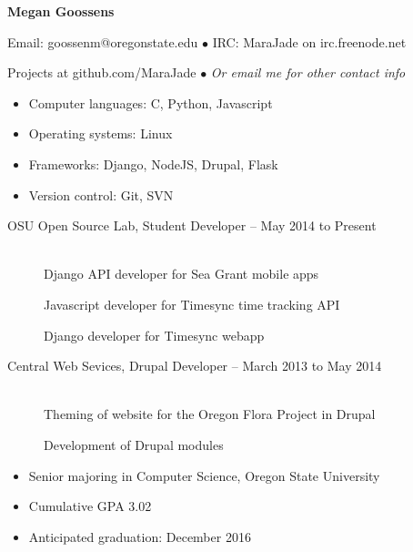 \documentclass[11pt]{article}
\begin{document}
\centerline{{\LARGE \bf Megan Goossens}}

\bigskip

\centerline{Email: goossenm@oregonstate.edu
        $\bullet$
        IRC: MaraJade on irc.freenode.net}
\centerline{Projects at github.com/MaraJade 
        $\bullet$
        \emph{Or email me for other contact info}}

\smallskip
\hrulefill
\bigskip

\begin{itemize}
  \item Computer languages: C, Python, Javascript

  \item Operating systems: Linux

  \item Frameworks: Django, NodeJS, Drupal, Flask

  \item Version control: Git, SVN
\end{itemize}

\bigskip
\hrulefill
\bigskip

\begin{description}
\item[OSU Open Source Lab, Student Developer -- May 2014 to Present]
    \hfill \\
    Django API developer for Sea Grant mobile apps

    Javascript developer for Timesync time tracking API

    Django developer for Timesync webapp
\end{description}


\begin{description}
\item[Central Web Sevices, Drupal Developer -- March 2013 to May 2014]
    \hfill \\
    Theming of website for the Oregon Flora Project in Drupal
    
    Development of Drupal modules
\end{description}

\smallskip
\hrulefill
\bigskip

\begin{itemize}
    \item Senior majoring in Computer Science, Oregon State University 

    \item Cumulative GPA 3.02

    \item Anticipated graduation: December 2016 
\end{itemize}
\end{document}
